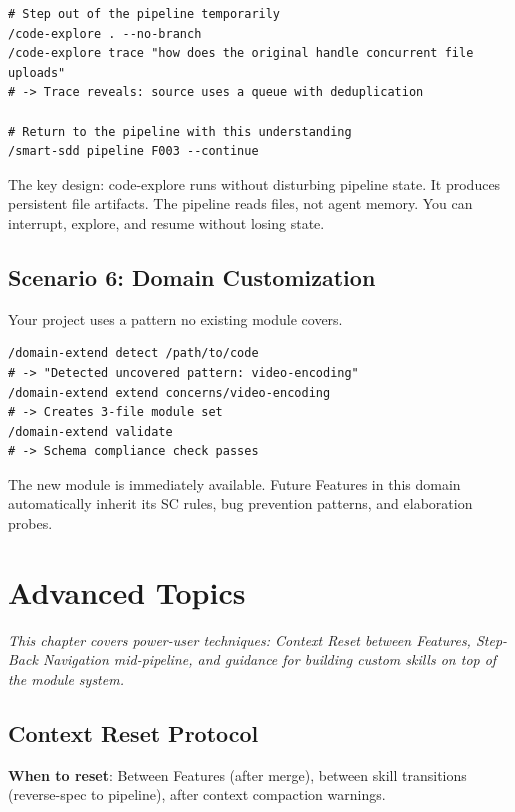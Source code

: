 \documentclass[11pt,a4paper,openright,twoside]{report}
\begin{document}
\begin{lstlisting}
# Step out of the pipeline temporarily
/code-explore . --no-branch
/code-explore trace "how does the original handle concurrent file uploads"
# -> Trace reveals: source uses a queue with deduplication

# Return to the pipeline with this understanding
/smart-sdd pipeline F003 --continue
\end{lstlisting}

The key design: code-explore runs without disturbing pipeline state. It produces persistent file artifacts. The pipeline reads files, not agent memory. You can interrupt, explore, and resume without losing state.

\section{Scenario 6: Domain Customization}

Your project uses a pattern no existing module covers.

\begin{lstlisting}
/domain-extend detect /path/to/code
# -> "Detected uncovered pattern: video-encoding"
/domain-extend extend concerns/video-encoding
# -> Creates 3-file module set
/domain-extend validate
# -> Schema compliance check passes
\end{lstlisting}

The new module is immediately available. Future Features in this domain automatically inherit its SC rules, bug prevention patterns, and elaboration probes.


\chapter{Advanced Topics}
\label{ch:advanced}

\textit{This chapter covers power-user techniques: Context Reset between Features, Step-Back Navigation mid-pipeline, and guidance for building custom skills on top of the module system.}

\section{Context Reset Protocol}

\textbf{When to reset}: Between Features (after merge), between skill transitions (reverse-spec to pipeline), after context compaction warnings.
\end{document}
